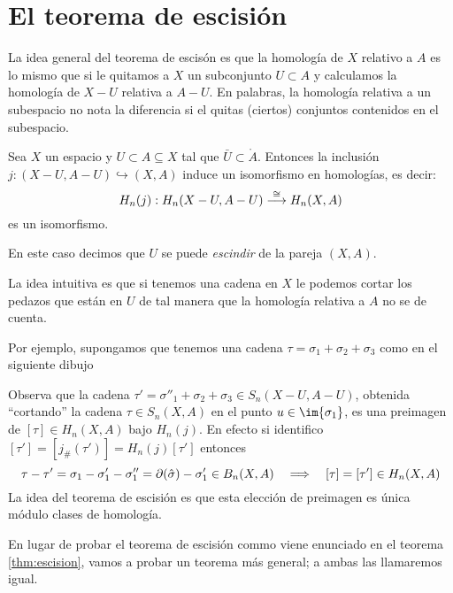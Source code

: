 \documentclass[../../topologia_algebraica]{subfiles}
\begin{document}
\section{El teorema de escisi\'on}

La idea general del teorema de escis\'on es que la homolog\'ia de $X$ relativo a
$A$ es lo mismo que si le quitamos a $X$ un subconjunto $U\subset A$ y calculamos la
homolog\'ia de $X-U$ relativa a $A-U$. En palabras, la homolog\'ia relativa a un
subespacio no nota la diferencia si el quitas (ciertos) conjuntos contenidos en el
subespacio.

\begin{thm}\label{thm:escision}
  Sea $X$ un espacio y $U\subset A\subseteq X$ tal que $\bar{U}\subset\mathring{A}$.
  Entonces la inclusi\'on $j:(X-U,A-U)\hookrightarrow (X,A)$ induce un isomorfismo
  en homolog\'ias, es decir:
  \[
    H_n(j):H_n(X-U,A-U) \stackrel{\cong}{\longrightarrow} H_n(X,A)
  \]
  es un isomorfismo.
\end{thm}

En este caso decimos que $U$ se puede \emph{escindir} de la pareja $(X,A)$.

La idea intuitiva es que si tenemos una cadena en $X$ le podemos cortar los
pedazos que est\'an en $U$ de tal manera que la homolog\'ia relativa a $A$
no se de cuenta.

Por ejemplo, supongamos que tenemos una cadena $\tau=\sigma_1+\sigma_2+\sigma_3$
como en el siguiente dibujo

\begin{figure}[h!]%
  \centering
\end{figure}%

Observa que la cadena $\tau'=\sigma''_1+\sigma_2+\sigma_3\in S_n(X-U,A-U)$, obtenida
``cortando'' la cadena $\tau\in S_n(X,A)$ en el punto $u\in\im{\sigma_1}$, es una
preimagen de $[\tau]\in H_n(X,A)$ bajo $H_n(j)$. En efecto si identifico
$[\tau']=[j_{\#}(\tau')]=H_n(j)[\tau']$ entonces
\[
  \tau-\tau'=\sigma_1-\sigma'_1-\sigma''_1=\partial(\hat{\sigma})-\sigma'_1\in B_n(X,A)
  \quad\Longrightarrow\quad [\tau]=[\tau']\in H_n(X,A)
\]
La idea del teorema de escisi\'on es que esta elecci\'on de preimagen es \'unica
m\'odulo clases de homolog\'ia.

En lugar de probar el teorema de escisi\'on commo viene enunciado en el teorema
\ref{thm:escision}, vamos a probar un teorema m\'as general; a ambas las llamaremos
igual.
\end{document}
